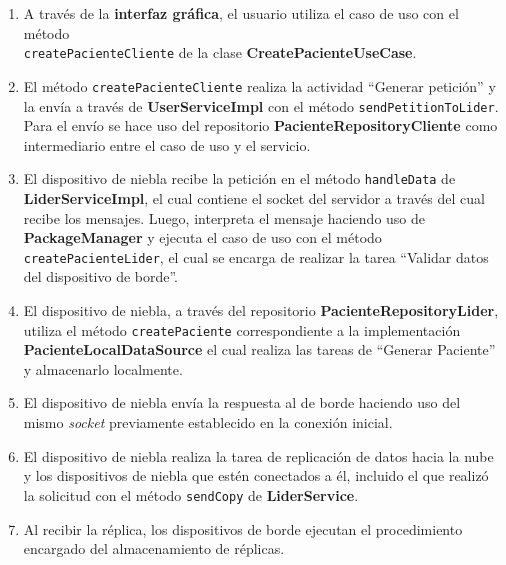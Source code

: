 \begin{enumerate}
    \item A través de la \textbf{interfaz gráfica}, el usuario utiliza el caso de uso con el método\\ \texttt{createPacienteCliente} de la clase \textbf{CreatePacienteUseCase}.
    
    \item El método \texttt{createPacienteCliente} realiza la actividad ``Generar petición'' y la envía a través de \textbf{UserServiceImpl} con el método \texttt{sendPetitionToLider}. Para el envío se hace uso del repositorio \textbf{PacienteRepositoryCliente} como intermediario entre el caso de uso y el servicio.

    \item El dispositivo de niebla recibe la petición en el método \texttt{handleData} de \textbf{LiderServiceImpl}, el cual contiene el socket del servidor a través del cual recibe los mensajes. Luego, interpreta el mensaje haciendo uso de \textbf{PackageManager} y ejecuta el caso de uso con el método\\ \texttt{createPacienteLider}, el cual se encarga de realizar la tarea ``Validar datos del dispositivo de borde''.

    \item El dispositivo de niebla, a través del repositorio \textbf{PacienteRepositoryLider}, utiliza el método \texttt{createPaciente} correspondiente a la implementación \textbf{PacienteLocalDataSource} el cual realiza las tareas de ``Generar Paciente'' y almacenarlo localmente.

    \item El dispositivo de niebla envía la respuesta al de borde haciendo uso del mismo \textit{socket} previamente establecido en la conexión inicial.

    \item El dispositivo de niebla realiza la tarea de replicación de datos hacia la nube y los dispositivos de niebla que estén conectados a él, incluido el que realizó la solicitud con el método \texttt{sendCopy} de \textbf{LiderService}.

    \item Al recibir la réplica, los dispositivos de borde ejecutan el procedimiento encargado del almacenamiento de réplicas.
    
\end{enumerate}





